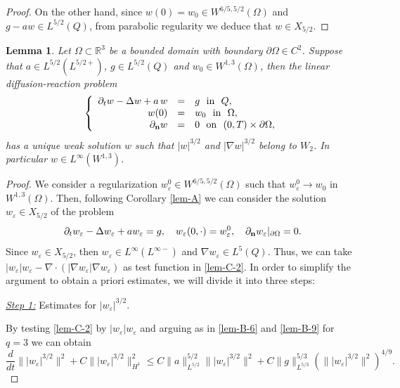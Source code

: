 \documentclass[11pt,reqno]{amsart}%
\newtheorem{lemma}[theorem]{Lemma}
\numberwithin{equation}{section}
\begin{document}
{\begin{proof}
On the other hand, since $w(0)=w_0\in W^{6/5,5/2}(\Omega)$ and $g-aw\in L^{5/2}(Q)$, from parabolic regularity we deduce that $w\in X_{5/2}$.
\end{proof}

 \begin{lemma}\label{lem-C}
 Let $\Omega\subset\mathbb{R}^3$ be a bounded domain with boundary $\partial\Omega\in C^2$. Suppose that $a\in L^{5/2}(L^{5/2+})$, $g\in L^{5/2}(Q)$ and $w_0\in W^{1,3}(\Omega)$, then the linear 
 diffusion-reaction problem
 \begin{equation}\label{lem-C-1}
 \left\{
 \begin{array}{rcl}
 \partial_tw-\Delta w+a\, w&=&g\ \mbox{ in }\ Q,\\
 w(0)&=&w_0\ \mbox{ in }\ \Omega,\\
 \partial_{\bf n}w&=&0\ \mbox{ on }\ (0,T)\times\partial\Omega,
 \end{array}
 \right.
 \end{equation}
 has a unique weak solution $w$ such that $|w|^{3/2}$ and 
 $|\nabla w|^{3/2}$ belong to $W_2$. 
 In particular  $w\in L^\infty(W^{1,3})$.
 \end{lemma}
 
 \begin{proof} 
 We consider a regularization $w_\varepsilon^0\in W^{6/5,5/2}(\Omega)$ such that $w_\varepsilon^0\to w_0$ in $W^{1,3}(\Omega)$. 
 Then,  following Corollary \ref{lem-A}  
 we can consider the solution $w_\varepsilon\in X_{5/2}$ of the problem 
  \begin{equation}\label{lem-C-2}
 \partial_tw_\varepsilon-\Delta w_\varepsilon+aw_\varepsilon=g,\quad w_\varepsilon(0,\cdot)=w^0_\varepsilon,\quad \partial_{\bf n}w_\varepsilon|_{\partial\Omega}=0.
 \end{equation}
 Since $w_\varepsilon \in X_{5/2}$, then $w_\varepsilon\in L^\infty(L^{\infty-})$ and $\nabla w_\varepsilon\in L^5(Q)$. Thus, we can take $|w_\varepsilon|w_\varepsilon
 -\nabla\cdot (|\nabla w_\varepsilon|\nabla w_\varepsilon)$ as test function in \eqref{lem-C-2}. In order to simplify the argument to obtain a priori estimates, we will divide it into three steps:
 \vspace{0.1cm}
 
 \noindent\underline{\it Step 1:} Estimates for $|w_\varepsilon|^{3/2}$. 

 
By testing \eqref{lem-C-2} by $|w_\varepsilon|w_\varepsilon$ and arguing as in  \eqref{lem-B-6} and \eqref{lem-B-9}  for $q=3$ we can obtain
\begin{equation}\label{lem-C-3}
\frac{d}{dt}\||w_\varepsilon|^{3/2}\|^2+C\||w_\varepsilon|^{3/2}\|^2_{H^1}
\le C \|a\|_{L^{5/2}}^{5/2} \||w_\varepsilon|^{3/2}\|^2
+C\|g\|_{L^{5/3}}^{5/3} 
(\||w_\varepsilon|^{3/2}\|^2)^{4/9}.
\end{equation}
 

\end{proof}}
\end{document}
